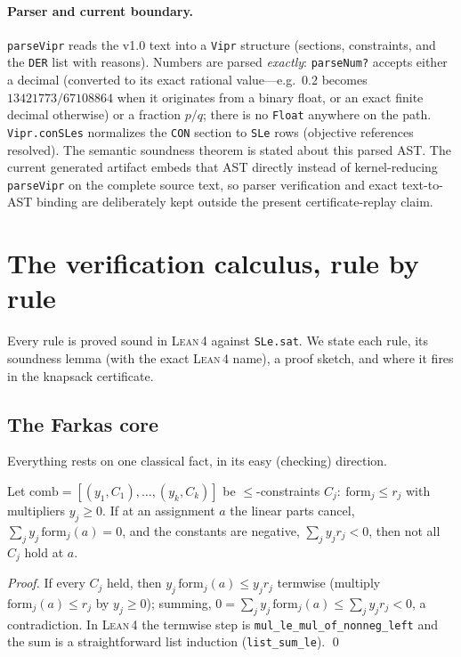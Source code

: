 \documentclass[runningheads]{llncs}
\newcommand{\code}[1]{\texttt{#1}}
\newcommand{\lean}{\textsc{Lean\,4}}
\begin{document}
\paragraph{Parser and current boundary.} \code{parseVipr} reads the v1.0 text into a \code{Vipr}
structure (sections, constraints, and the \code{DER} list with reasons). Numbers are
parsed \emph{exactly}: \code{parseNum?} accepts either a decimal (converted to its exact
rational value---e.g.\ $0.2$ becomes $13421773/67108864$ when it originates from a
binary float, or an exact finite decimal otherwise) or a fraction $p/q$; there is no
\code{Float} anywhere on the path. \code{Vipr.conSLes} normalizes the \code{CON} section
to \code{SLe} rows (objective references resolved). The semantic soundness theorem is
stated about this parsed AST. The current generated artifact embeds that AST directly
instead of kernel-reducing \code{parseVipr} on the complete source text, so parser
verification and exact text-to-AST binding are deliberately kept outside the present
certificate-replay claim.

\section{The verification calculus, rule by rule}\label{sec:calculus}

Every rule is proved sound in \lean{} against \code{SLe.sat}. We state each rule, its
soundness lemma (with the exact \lean{} name), a proof sketch, and where it fires in the
knapsack certificate.

\subsection{The Farkas core}\label{sec:calc-farkas}
Everything rests on one classical fact, in its easy (checking) direction.

\begin{lemma}[\code{farkas\_le}]\label{lem:farkas}
Let $\mathrm{comb}=[(y_1,C_1),\dots,(y_k,C_k)]$ be $\le$-constraints $C_j:\
\mathrm{form}_j\le r_j$ with multipliers $y_j\ge0$. If at an assignment $a$ the linear
parts cancel, $\sum_j y_j\,\mathrm{form}_j(a)=0$, and the constants are negative,
$\sum_j y_j r_j<0$, then not all $C_j$ hold at $a$.
\end{lemma}
\begin{proof}
If every $C_j$ held, then $y_j\,\mathrm{form}_j(a)\le y_j r_j$ termwise (multiply
$\mathrm{form}_j(a)\le r_j$ by $y_j\ge0$); summing, $0=\sum_j y_j\,\mathrm{form}_j(a)\le
\sum_j y_j r_j<0$, a contradiction. In \lean{} the termwise step is
\code{mul\_le\_mul\_of\_nonneg\_left} and the sum is a straightforward list induction
(\code{list\_sum\_le}). \qed
\end{proof}
\end{document}
